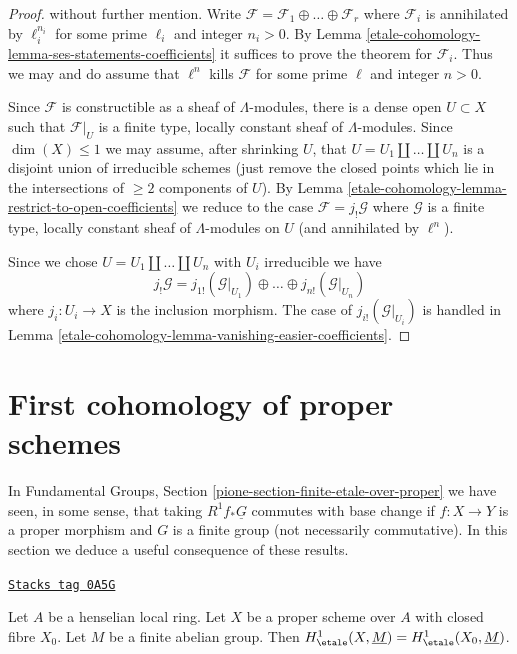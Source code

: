 \begin{proof}
without further mention.
Write $\mathcal{F} = \mathcal{F}_1 \oplus \ldots \oplus \mathcal{F}_r$
where $\mathcal{F}_i$ is annihilated by $\ell_i^{n_i}$
for some prime $\ell_i$ and integer $n_i > 0$.
By Lemma \ref{etale-cohomology-lemma-ses-statements-coefficients} it suffices
to prove the theorem for $\mathcal{F}_i$. Thus we may and do
assume that $\ell^n$ kills $\mathcal{F}$ for some prime $\ell$
and integer $n > 0$.

\medskip\noindent
Since $\mathcal{F}$ is constructible as a sheaf of $\Lambda$-modules,
there is a dense open $U \subset X$ such that $\mathcal{F}|_U$ is a
finite type, locally constant sheaf of $\Lambda$-modules.
Since $\dim(X) \leq 1$ we may assume, after shrinking $U$, that
$U = U_1 \amalg \ldots \amalg U_n$ is a disjoint union of irreducible
schemes (just remove the closed points which lie in the intersections
of $\geq 2$ components of $U$). By
Lemma \ref{etale-cohomology-lemma-restrict-to-open-coefficients}
we reduce to the case
$\mathcal{F} = j_!\mathcal{G}$ where $\mathcal{G}$ is a finite type,
locally constant sheaf of $\Lambda$-modules on $U$ (and annihilated
by $\ell^n$).

\medskip\noindent
Since we chose $U = U_1 \amalg \ldots \amalg U_n$ with $U_i$ irreducible
we have
$$
j_!\mathcal{G} =
j_{1!}(\mathcal{G}|_{U_1}) \oplus \ldots \oplus
j_{n!}(\mathcal{G}|_{U_n})
$$
where $j_i : U_i \to X$ is the inclusion morphism.
The case of $j_{i!}(\mathcal{G}|_{U_i})$ is handled in
Lemma \ref{etale-cohomology-lemma-vanishing-easier-coefficients}.
\end{proof}

\section{First cohomology of proper schemes}
\label{etale-cohomology-section-finite-etale-over-proper}
In Fundamental Groups, Section \ref{pione-section-finite-etale-over-proper}
we have seen, in some sense, that taking
$R^1f_*\underline{G}$ commutes with base change if $f : X \to Y$
is a proper morphism and $G$ is a finite group (not necessarily
commutative). In this section
we deduce a useful consequence of these results.

\begin{lemma}
\label{etale-cohomology-lemma-proper-over-henselian-and-h1}
\href{https://stacks.math.columbia.edu/tag/0A5G}{\texttt{Stacks tag 0A5G}}

Let $A$ be a henselian local ring. Let $X$ be a proper scheme over $A$
with closed fibre $X_0$. Let $M$ be a finite abelian group.
Then $H^1_\etale(X, \underline{M}) = H^1_\etale(X_0, \underline{M})$.
\end{lemma}

